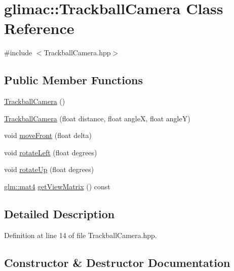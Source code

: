 \hypertarget{classglimac_1_1_trackball_camera}{}\section{glimac\+:\+:Trackball\+Camera Class Reference}
\label{classglimac_1_1_trackball_camera}


{\ttfamily \#include $<$Trackball\+Camera.\+hpp$>$}

\subsection*{Public Member Functions}
\begin{DoxyCompactItemize}
\item 
\hyperlink{classglimac_1_1_trackball_camera_a57c5a9f62161ed00958cdbcb9987ce49}{Trackball\+Camera} ()
\item 
\hyperlink{classglimac_1_1_trackball_camera_af288f1fb23e598ea198b0b666c55e2bd}{Trackball\+Camera} (float distance, float angleX, float angleY)
\item 
void \hyperlink{classglimac_1_1_trackball_camera_a78aa452ab479ec1bb9793b46317fcc52}{move\+Front} (float delta)
\item 
void \hyperlink{classglimac_1_1_trackball_camera_a88867a2252c47130f90b9dcf6ea0aa44}{rotate\+Left} (float degrees)
\item 
void \hyperlink{classglimac_1_1_trackball_camera_a7cb7c641caae3d6a1b7a575c7461016c}{rotate\+Up} (float degrees)
\item 
\hyperlink{group__core__types_ga7dcd2365c2e368e6af5b7adeb6a9c8df}{glm\+::mat4} \hyperlink{classglimac_1_1_trackball_camera_ab78f1303ef06065a639e383be767b7ba}{get\+View\+Matrix} () const
\end{DoxyCompactItemize}


\subsection{Detailed Description}


Definition at line 14 of file Trackball\+Camera.\+hpp.



\subsection{Constructor \& Destructor Documentation}
\mbox{\label{classglimac_1_1_trackball_camera_a57c5a9f62161ed00958cdbcb9987ce49}} 
